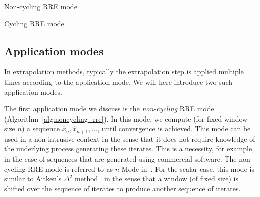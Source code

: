 \begin{algorithm}
	\caption{%
		\ac{RRE} for stationary processes~\eqref{eqn:xi_fp}
		in standard formulation~\eqref{eqn:rre_opt}
	}%
	\label{alg:rre}
	\medskip
	\medskip
\end{algorithm}

\begin{algorithm}
	\caption{Non-cycling \ac{RRE} mode}\label{alg:noncycling_rre}
\end{algorithm}

\begin{algorithm}
	\caption{Cycling \ac{RRE} mode}\label{alg:cycling_rre}
\end{algorithm}

\subsection{Application modes}

In extrapolation methods, typically the extrapolation step is applied multiple times according to the application mode.
We will here introduce two such application modes.

The first application mode we discuss is the \emph{non-cycling} \ac{RRE} mode (Algorithm~\ref{alg:noncycling_rre}).
In this mode, we compute (for fixed window size $n$) a sequence $\widehat{x}_n, \widehat{x}_{n+1}, \dots$,
until convergence is achieved.
This mode can be used in a non-intrusive context in the sense that it does not require knowledge of the underlying process generating these iterates.
This is a necessity, for example, in the case of sequences that are generated using commercial software.
The non-cycling \ac{RRE} mode is referred to as $n$-Mode in~\cite{sidi2020convergence}.
For the scalar case, this mode is similar to Aitken's $\Delta^2$ method~\cite{aitken1927bernoulli} in the sense that a window (of fixed size) is shifted over the sequence of iterates to produce another sequence of iterates.

